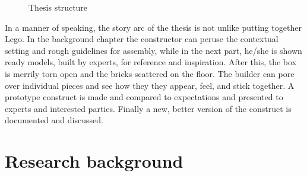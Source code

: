 \documentclass[12pt,a4paper,oneside,pdftex]{report}
\begin{document}
\begin{figure}[H]
\centering
\caption{Thesis structure} \label{fig:thesisstructure}
\end{figure}

In a manner of speaking, the story arc of the thesis is not unlike putting together Lego. In the background chapter the constructor can peruse the contextual setting and rough guidelines for assembly, while in the next part, he/she is shown ready models, built by experts, for reference and inspiration. After this, the box is merrily torn open and the bricks scattered on the floor. The builder can pore over individual pieces and see how they they appear, feel, and stick together. A prototype construct is made and compared to expectations and presented to experts and interested parties. Finally a new, better version of the construct is documented and discussed.

\chapter{Research background}
\label{chapter:background}
\end{document}
